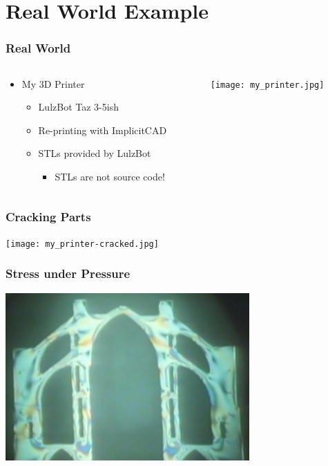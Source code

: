 \documentclass{beamer}
\begin{document}
\section{Real World Example}
\begin{frame}
\frametitle{Real World}
\begin{columns}
  \begin{column}{0.5\textwidth}
  \begin{itemize}
  \item My 3D Printer
    \begin{itemize}
    \item LulzBot Taz 3-5ish
    \item Re-printing with ImplicitCAD
    \item STLs provided by LulzBot
      \begin{itemize}
        \item STLs are not source code!
      \end{itemize}      
    \end{itemize}
  \end{itemize}
  \end{column}
  \begin{column}{0.5\textwidth}
\texttt{[image: my\_printer.jpg]}
  \end{column}
\end{columns}
\end{frame}

\begin{frame}
\frametitle{Cracking Parts}
\texttt{[image: my\_printer-cracked.jpg]}
\end{frame}

\begin{frame}
\frametitle{Stress under Pressure}
\includegraphics[width=0.7\textwidth, center]{robert_mark-cathedral.png}
\end{frame}
\end{document}
